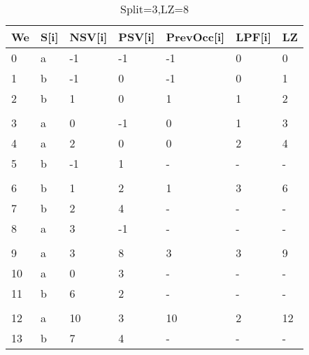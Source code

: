 \begin{table}[h]
\centering
\begin{tabular}{@{}lllllll@{}}
\toprule
We  & S{[}i{]} & NSV{[}i{]} & PSV{[}i{]} & PrevOcc{[}i{]} & LPF{[}i{]} & LZ \\ \midrule
0  & a        & -1         & -1         & -1             & 0          & 0  \\
1  & b        & -1         & 0          & -1             & 0          & 1  \\
2  & b        & 1          & 0          & 1              & 1          & 2  \\
   &          &            &            &                &            &    \\
3  & a        & 0          & -1         & 0              & 1          & 3  \\
4  & a        & 2          & 0          & 0              & 2          & 4  \\
5  & b        & -1         & 1          & -              & -          & -  \\
   &          &            &            &                &            &    \\
6  & b        & 1          & 2          & 1              & 3          & 6  \\
7  & b        & 2          & 4          & -              & -          & -  \\
8  & a        & 3          & -1         & -              & -          & -  \\
   &          &            &            &                &            &    \\
9  & a        & 3          & 8          & 3              & 3          & 9  \\
10 & a        & 0          & 3          & -              & -          & -  \\
11 & b        & 6          & 2          & -              & -          & -  \\
   &          &            &            &                &            &    \\
12 & a        & 10         & 3          & 10             & 2          & 12 \\
13 & b        & 7          & 4          & -              & -          & -  \\ \bottomrule
\end{tabular}
\caption{Split=3,LZ=8}
\label{tab:example3}
\end{table}

